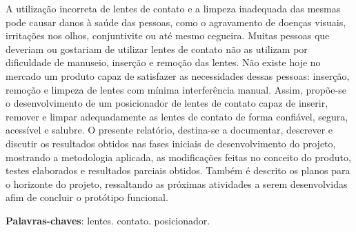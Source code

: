 \begin{resumo}
 
A utilização incorreta de lentes de contato e a limpeza inadequada das mesmas
pode causar danos à saúde das pessoas, como o agravamento de doenças visuais,
irritações nos olhos, conjuntivite ou até mesmo cegueira. Muitas pessoas que deveriam 
ou gostariam de utilizar lentes de contato não as utilizam por dificuldade de manuseio,
inserção e remoção das lentes. Não existe hoje no mercado um produto capaz de satisfazer
as necessidades dessas pessoas: inserção, remoção e limpeza de lentes com mínima interferência
manual. Assim, propõe-se o desenvolvimento de um posicionador de lentes de contato capaz de inserir, remover
e limpar adequadamente as lentes de contato de forma confiável, segura, acessível e salubre. O presente
relatório, destina-se a documentar, descrever e discutir os resultados obtidos nas fases iniciais de
desenvolvimento do projeto, mostrando a metodologia aplicada, as modificações feitas no conceito 
do produto, testes elaborados e resultados parciais obtidos. Também é descrito os planos para o horizonte do
projeto, ressaltando as próximas atividades a serem desenvolvidas afim de concluir o protótipo funcional.

 \vspace{\onelineskip}
    
 \noindent
 \textbf{Palavras-chaves}: lentes. contato. posicionador.
\end{resumo}
